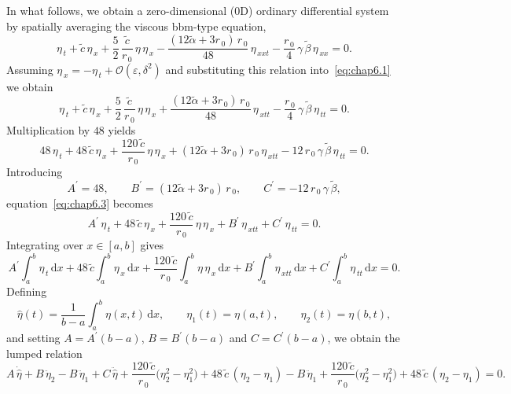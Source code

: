 \documentclass[alpha-refs, 12pt]{wiley-article}
\renewcommand{\O}{\mathcal{O}}
\newcommand{\ud}{\mathrm{d}}
\newcommand{\eps}{\varepsilon}
\begin{document}
In what follows, we obtain a zero-dimensional (0D) ordinary differential system by spatially averaging the viscous \acrshort{bbm}-type equation,
\begin{equation}\label{eq:chap6.1}
  \eta_{\,t}
  +\tilde{c}\,\eta_{\,x}
  +\frac{5}{2}\,\frac{\tilde{c}}{r_{\,0}}\,\eta\,\eta_{\,x}
  -\frac{(12\tilde{\alpha}+3r_{\,0})\,r_{\,0}}{48}\,\eta_{\,xxt}
  -\frac{r_{\,0}}{4}\,\gamma\,\tilde{\beta}\,\eta_{\,xx}=0.
\end{equation}
Assuming
\(\eta_{\,x}=-\eta_{\,t} + \O(\eps,\delta^{2})\) and substituting this
relation into~\eqref{eq:chap6.1} we obtain
\begin{equation}\label{eq:chap6.2}
  \eta_{\,t}
  +\tilde{c}\,\eta_{\,x}
  +\frac{5}{2}\,\frac{\tilde{c}}{r_{\,0}}\,\eta\,\eta_{\,x}
  +\frac{(12\tilde{\alpha}+3r_{\,0})\,r_{\,0}}{48}\,\eta_{\,xtt}
  -\frac{r_{\,0}}{4}\,\gamma\,\tilde{\beta}\,\eta_{\,tt}=0.
\end{equation}
Multiplication by \(48\) yields
\begin{equation}\label{eq:chap6.3}
  48\,\eta_{\,t}
  +48\,\tilde{c}\,\eta_{\,x}
  +\frac{120\,\tilde{c}}{r_{\,0}}\,\eta\,\eta_{\,x}
  +(12\tilde{\alpha}+3r_{\,0})\,r_{\,0}\,\eta_{\,xtt}
  -12\,r_{\,0}\,\gamma\,\tilde{\beta}\,\eta_{\,tt}=0.
\end{equation}
Introducing
\[
  A^{\prime}=48,\qquad
  B^{\prime}=(12\tilde{\alpha}+3r_{\,0})\,r_{\,0},\qquad
  C^{\prime}=-12\,r_{\,0}\,\gamma\,\tilde{\beta},
\]
equation~\eqref{eq:chap6.3} becomes
\begin{equation}
  A^{\prime}\,\eta_{\,t}
  +48\,\tilde{c}\,\eta_{\,x}
  +\frac{120\,\tilde{c}}{r_{\,0}}\,\eta\,\eta_{\,x}
  +B^{\prime}\,\eta_{\,xtt}
  +C^{\prime}\,\eta_{\,tt}=0.
\end{equation}
Integrating over \(x\in[a,b]\) gives
\begin{equation}\label{eq:chap6.4}
  A^{\prime}\int_{a}^{b}\eta_{\,t}\,\ud x
  +48\,\tilde{c}\int_{a}^{b}\eta_{\,x}\,\ud x
  +\frac{120\,\tilde{c}}{r_{\,0}}\int_{a}^{b}\eta\,\eta_{\,x}\,\ud x
  +B^{\prime}\int_{a}^{b}\eta_{\,xtt}\,\ud x
  +C^{\prime}\int_{a}^{b}\eta_{\,tt}\,\ud x=0.
\end{equation}
Defining
\[
  \hat{\eta}(t)=\frac{1}{b-a}\int_{a}^{b}\eta(x,t)\,\ud x,\qquad
  \eta_{1}(t)=\eta(a,t),\qquad
  \eta_{2}(t)=\eta(b,t),
\]
and setting
\(A=A^{\prime}(b-a)\), \(B=B^{\prime}(b-a)\) and
\(C=C^{\prime}(b-a)\), we obtain the lumped relation
\begin{equation}\label{eq:chap6.5}
  A\,\dot{\hat{\eta}}
  +B\,\ddot{\eta}_{2}
  -B\,\ddot{\eta}_{1}
  +C\,\ddot{\hat{\eta}}
  +\frac{120\,\tilde{c}}{r_{\,0}}\bigl(\eta_{2}^{2}-\eta_{1}^{2}\bigr)
  +48\,\tilde{c}\,(\eta_{2}-\eta_{1})
  -B\,\ddot{\eta}_{1}
  +\frac{120\,\tilde{c}}{r_{\,0}}\bigl(\eta_{2}^{2}-\eta_{1}^{2}\bigr)
  +48\,\tilde{c}\,(\eta_{2}-\eta_{1})=0.
\end{equation}
\end{document}
